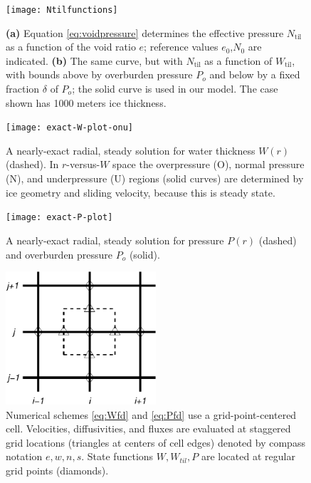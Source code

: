 \documentclass[gmd]{copernicus}   %
\begin{document}

\begin{figure}[ht]
\texttt{[image: Ntilfunctions]}
\caption{\textbf{(a)} Equation \eqref{eq:voidpressure} determines the effective pressure $N_{\text{til}}$ as a function of the void ratio $e$; reference values $e_0$,$N_0$ are indicated.  \textbf{(b)}  The same curve, but with $N_{\text{til}}$ as a function of $W_{\text{til}}$, with bounds above by overburden pressure $P_o$ and below by a fixed fraction $\delta$ of $P_o$; the solid curve is used in our model.  The case shown has 1000 meters ice thickness.}
\label{fig:Ntilfunctions}
\end{figure}

\begin{figure}[ht]
\texttt{[image: exact-W-plot-onu]}
\caption{A nearly-exact radial, steady solution for water thickness $W(r)$ (dashed).  In $r$-versus-$W$ space the overpressure (O), normal pressure (N), and underpressure (U) regions (solid curves) are determined by ice geometry and sliding velocity, because this is steady state.}
\label{fig:Wexact}
\end{figure}

\begin{figure}[ht]
\texttt{[image: exact-P-plot]}
\caption{A nearly-exact radial, steady solution for pressure $P(r)$ (dashed) and overburden pressure $P_o$ (solid).}
\label{fig:Pexact}
\end{figure}

\begin{figure}[ht]
\centering
\includegraphics[width=5.59cm,keepaspectratio=true]{diffstencil}
\bigskip
\caption{Numerical schemes \eqref{eq:Wfd} and \eqref{eq:Pfd} use a grid-point-centered cell.  Velocities, diffusivities, and fluxes are evaluated at staggered grid locations (triangles at centers of cell edges) denoted by compass notation $e,w,n,s$.  State functions $W,W_{til},P$ are located at regular grid points (diamonds).}
\label{fig:stencil}
\end{figure}
\end{document}

